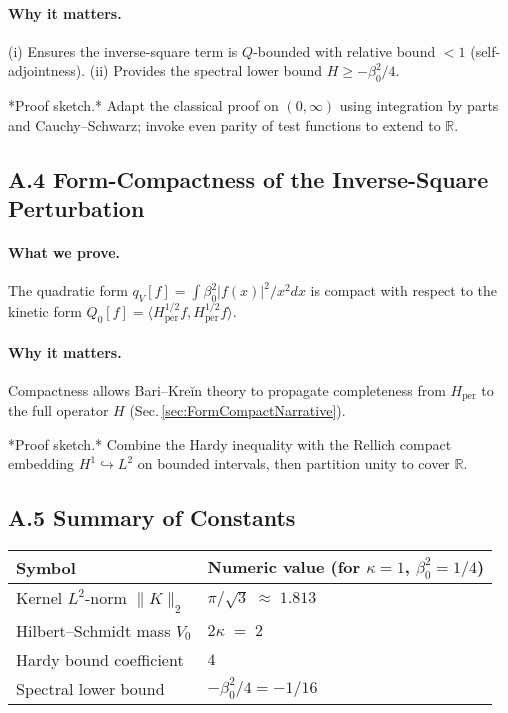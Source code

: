\documentclass[11pt]{article}
\begin{document}
\paragraph{Why it matters.}  
(i) Ensures the inverse-square term is $Q$-bounded with relative bound
\(<1\) (self-adjointness).  
(ii) Provides the spectral lower bound
\(H\ge -\beta_{0}^{2}/4\).

*Proof sketch.*  
Adapt the classical proof on \((0,\infty)\) using integration by parts
and Cauchy–Schwarz; invoke even parity of test functions to extend to
\(\mathbb R\).

\vspace{1em}
\subsection*{A.4  Form-Compactness of the Inverse-Square Perturbation}

\paragraph{What we prove.}  
The quadratic form  
\(q_{V}[f]=\displaystyle\int\beta_{0}^{2}|f(x)|^{2}/x^{2}dx\)
is compact with respect to the kinetic form
\(Q_{0}[f]=\langle H_{\mathrm{per}}^{1/2}f, H_{\mathrm{per}}^{1/2}f\rangle\).

\paragraph{Why it matters.}  
Compactness allows Bari–Kreĭn theory to propagate completeness from
\(H_{\mathrm{per}}\) to the full operator \(H\)
(Sec.\,\ref{sec:FormCompactNarrative}).

*Proof sketch.*  
Combine the Hardy inequality with the Rellich compact embedding
\(H^{1}\hookrightarrow L^{2}\) on bounded intervals,
then partition unity to cover \(\mathbb R\).

\vspace{1em}
\subsection*{A.5  Summary of Constants}

\begin{center}
\begin{tabular}{@{}ll@{}}
\toprule
Symbol & Numeric value (for $\kappa=1$, $\beta_{0}^{2}=1/4$) \\
\midrule
Kernel $L^{2}$-norm $\|K\|_{2}$ & $\pi/\sqrt{3}\;\approx\;1.813$ \\
Hilbert–Schmidt mass $V_{0}$ & $2\kappa \;=\; 2$ \\
Hardy bound coefficient & $4$ \\
Spectral lower bound & $-\beta_{0}^{2}/4 = -1/16$ \\
\bottomrule
\end{tabular}
\end{center}
\end{document}
